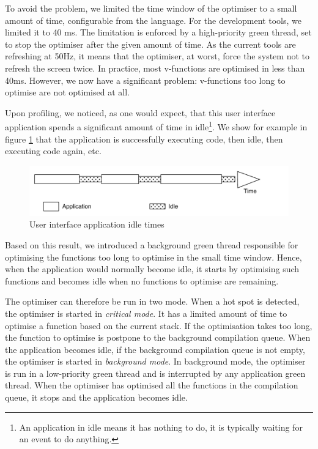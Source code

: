 \documentclass[a4paper,12pt,twoside]{../includes/ThesisStyle}
\begin{document}
To avoid the problem, we limited the time window of the optimiser to a small amount of time, configurable from the language. For the development tools, we limited it to 40 ms. The limitation is enforced by a high-priority green thread, set to stop the optimiser after the given amount of time. As the current tools are refreshing at 50Hz, it means that the optimiser, at worst, force the system not to refresh the screen twice. In practice, most v-functions are optimised in less than 40ms. However, we now have a significant problem: v-functions too long to optimise are not optimised at all.

Upon profiling, we noticed, as one would expect, that this user interface application spends a significant amount of time in idle\footnote{An application in idle means it has nothing to do, it is typically waiting for an event to do anything.}. We show for example in figure \ref{fig:ApplicationIdle} that the application is successfully executing code, then idle, then executing code again, etc. 

\begin{figure}[h!]
    \begin{center}
        \includegraphics[width=0.95\linewidth]{ApplicationIdle}
        \caption{User interface application idle times}
        \label{fig:ApplicationIdle}
    \end{center}
\end{figure}

Based on this result, we introduced a background green thread responsible for optimising the functions too long to optimise in the small time window. Hence, when the application would normally become idle, it starts by optimising such functions and becomes idle when no functions to optimise are remaining.

The optimiser can therefore be run in two mode. When a hot spot is detected, the optimiser is started in \emph{critical mode}. It has a limited amount of time to optimise a function based on the current stack. If the optimisation takes too long, the function to optimise is postpone to the background compilation queue. When the application becomes idle, if the background compilation queue is not empty, the optimiser is started in \emph{background mode}. In background mode, the optimiser is run in a low-priority green thread and is interrupted by any application green thread. When the optimiser has optimised all the functions in the compilation queue, it stops and the application becomes idle.
\end{document}
